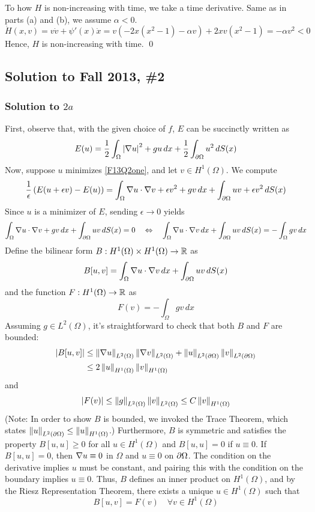 To how $H$ is non-increasing with time, we take a time derivative. Same as in parts (a) and (b), we assume $\alpha < 0$.
$$ \dot{H}(x,v) = v \dot{v} + \psi'(x) \dot{x} = v(-2x(x^2-1)-\alpha v) + 2xv(x^2-1) = -\alpha v^2 < 0 $$
Hence, $H$ is non-increasing with time. \hfill \qed


\subsection*{Solution to Fall 2013, \#2}
\label{F13Q2}

\subsubsection*{Solution to $2a$}
	
First, observe that, with the given choice of $f$, $E$ can be succinctly written as
\begin{equation}
	\label{F13Q2one}
	E(u) = \frac{1}{2} \int_{\Omega} \left|\nabla u\right|^2 + gu \,dx + \frac{1}{2} \int_{\partial \Omega} u^2 \, dS(x)
\end{equation}
Now, suppose $u$ minimizes \eqref{F13Q2one}, and let $v \in H^1(\Omega)$. We compute
$$ \frac{1}{\epsilon} \left(E(u+\epsilon v) - E(u) \right) = \int_{\Omega} \nabla u \cdot \nabla v + \epsilon v^2 + gv \,dx + \int_{\partial \Omega} u v + \epsilon v^2 \, dS(x) $$
Since $u$ is a minimizer of $E$, sending $\epsilon \to 0$ yields
$$ \int_{\Omega} \nabla u \cdot \nabla v + gv \,dx + \int_{\partial \Omega} u v \, dS(x) = 0 \quad \Leftrightarrow \quad \int_{\Omega} \nabla u \cdot \nabla v \, dx + \int_{\partial \Omega} u v \, dS(x) = - \int_{\Omega} gv \, dx $$
Define the bilinear form $B : H^1(\Omega) \times H^1(\Omega) \to \mathbb{R}$ as
$$ B[u,v] = \int_{\Omega} \nabla u \cdot \nabla v \, dx + \int_{\partial \Omega} uv \, dS(x) $$
and the function $F : H^1(\Omega) \to \mathbb{R}$ as
$$ F(v) = -\int_{\Omega} gv \, dx $$
Assuming $g \in L^2(\Omega)$, it's straightforward to check that both $B$ and $F$ are bounded:
\begin{align*}
	|B[u,v]| &\leq \left\|\nabla u\right\|_{L^2(\Omega)} \left\|\nabla v\right\|_{L^2(\Omega)} + \left\|u\right\|_{L^2(\partial \Omega)} \left\|v\right\|_{L^2(\partial \Omega)} \\
	&\leq 2 \left\|u\right\|_{H^1(\Omega)} \left\|v\right\|_{H^1(\Omega)}
\end{align*}
and
$$ |F(v)| \leq \left\|g\right\|_{L^2(\Omega)} \left\|v\right\|_{L^2(\Omega)} \leq C \left\|v\right\|_{H^1(\Omega)} $$
(Note: In order to show $B$ is bounded, we invoked the Trace Theorem, which states $\left\|u\right\|_{L^2(\partial \Omega)} \leq \left\|u\right\|_{H^1(\Omega)}$.) Furthermore, $B$ is symmetric and satisfies the property $B[u,u] \geq 0$ for all $u \in H^1(\Omega)$ and $B[u,u] = 0$ if $u \equiv 0$. If $B[u,u] = 0$, then $\nabla u \equiv 0$ in $\Omega$ and $u \equiv 0$ on $\partial \Omega$. The condition on the derivative implies $u$ must be constant, and pairing this with the condition on the boundary implies $u \equiv 0$. Thus, $B$ defines an inner product on $H^1(\Omega)$, and by the Riesz Representation Theorem, there exists a unique $u \in H^1(\Omega)$ such that
\begin{equation}
\label{F13Q2two}
	B[u,v] = F(v) \quad \forall v \in H^1(\Omega)
\end{equation}

